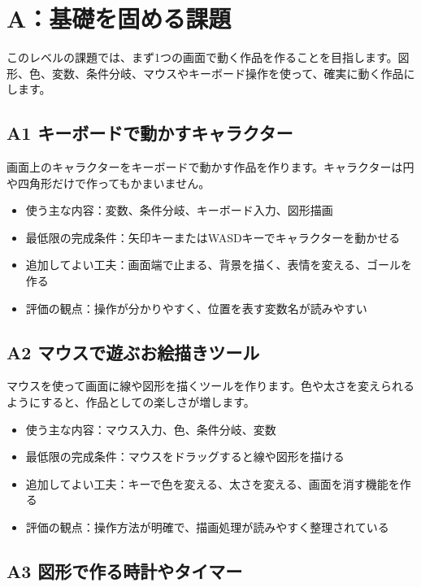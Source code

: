 \section{A：基礎を固める課題}

このレベルの課題では、まず1つの画面で動く作品を作ることを目指します。図形、色、変数、条件分岐、マウスやキーボード操作を使って、確実に動く作品にします。

\subsection{A1 キーボードで動かすキャラクター}

画面上のキャラクターをキーボードで動かす作品を作ります。キャラクターは円や四角形だけで作ってもかまいません。

\begin{itemize}
    \item 使う主な内容：変数、条件分岐、キーボード入力、図形描画
    \item 最低限の完成条件：矢印キーまたはWASDキーでキャラクターを動かせる
    \item 追加してよい工夫：画面端で止まる、背景を描く、表情を変える、ゴールを作る
    \item 評価の観点：操作が分かりやすく、位置を表す変数名が読みやすい
\end{itemize}

\subsection{A2 マウスで遊ぶお絵描きツール}

マウスを使って画面に線や図形を描くツールを作ります。色や太さを変えられるようにすると、作品としての楽しさが増します。

\begin{itemize}
    \item 使う主な内容：マウス入力、色、条件分岐、変数
    \item 最低限の完成条件：マウスをドラッグすると線や図形を描ける
    \item 追加してよい工夫：キーで色を変える、太さを変える、画面を消す機能を作る
    \item 評価の観点：操作方法が明確で、描画処理が読みやすく整理されている
\end{itemize}

\subsection{A3 図形で作る時計やタイマー}

